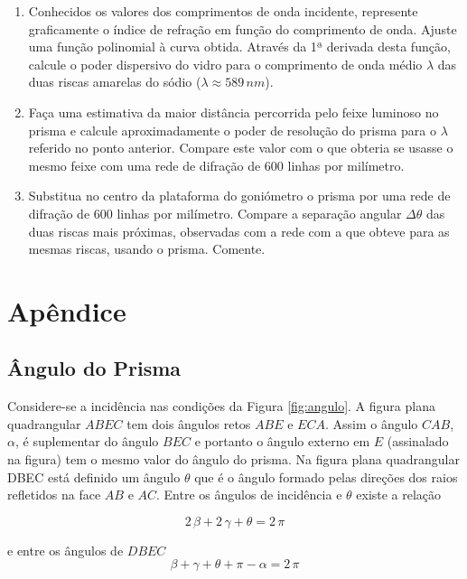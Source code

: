\documentclass[a4paper,12pt]{article}  %
\begin{document}
\begin{enumerate}
\item Conhecidos  os  valores  dos  comprimentos  de  onda  incidente, represente  graficamente  o 
índice de refração em função do comprimento de onda. Ajuste uma função polinomial à 
curva obtida. Através da 1ª derivada desta função, calcule o poder dispersivo do vidro para o comprimento de onda médio $\lambda$ das 
duas riscas amarelas do sódio ($\lambda \approx 589\,nm$). 
\item Faça uma estimativa da maior distância percorrida pelo feixe luminoso no prisma e calcule 
aproximadamente  o  poder  de  resolução  do  prisma  para  o  $\lambda$ referido  no  ponto  anterior. 
Compare este valor com o que obteria se usasse o mesmo feixe com uma rede de difração 
de 600 linhas por milímetro. 
\item Substitua no centro da plataforma do goniómetro o prisma por uma rede de difração de 
600 linhas por milímetro. Compare a separação angular $\Delta \theta$ das duas riscas mais próximas, 
observadas  com  a  rede  com  a  que  obteve  para  as  mesmas  riscas,  usando  o  prisma. 
Comente. 

\end{enumerate}

\section*{\sf Apêndice}
\subsection*{\sf Ângulo do Prisma}

Considere-se a incidência nas condições da Figura \ref{fig:angulo}.
A figura plana quadrangular $ABEC$ tem dois ângulos retos $ABE$ e $ECA$. Assim o ângulo $CAB$, $\alpha$, é suplementar do ângulo $BEC$ e portanto o ângulo externo em $E$ (assinalado na figura) tem o mesmo valor do ângulo do prisma.
Na figura plana quadrangular DBEC está definido um ângulo $θ$ que é o ângulo formado pelas direções dos raios refletidos na face $AB$ e $AC$. 
Entre os ângulos de incidência e $θ$ existe a relação 

 \begin{equation}
	\label{eq:soma}
	2\, \beta  + 2 \, \gamma + \theta = 2 \, \pi
\end{equation}

e entre os ângulos de $DBEC$ 
 \begin{equation}
	\label{eq:soma2}
	\beta  +  \gamma + \theta  + \pi - \alpha= 2 \, \pi
\end{equation}
\end{document}
